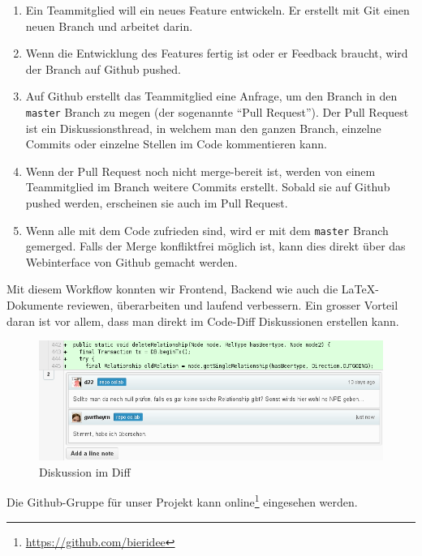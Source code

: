 \documentclass[10pt,a4paper]{scrartcl}
\begin{document}
\begin{enumerate}
	\item Ein Teammitglied will ein neues Feature entwickeln. Er erstellt mit Git einen neuen Branch
		und arbeitet darin.
	\item Wenn die Entwicklung des Features fertig ist oder er Feedback braucht, wird der Branch auf
		Github pushed.
	\item Auf Github erstellt das Teammitglied eine Anfrage, um den Branch in den \texttt{master}
		Branch zu megen (der sogenannte "`Pull Request"'). Der Pull Request ist ein Diskussionsthread,
		in welchem man den ganzen Branch, einzelne Commits oder einzelne Stellen im Code kommentieren
		kann.
	\item Wenn der Pull Request noch nicht merge-bereit ist, werden von einem Teammitglied im Branch
		weitere Commits erstellt. Sobald sie auf Github pushed werden, erscheinen sie auch im Pull
		Request.
	\item Wenn alle mit dem Code zufrieden sind, wird er mit dem \texttt{master} Branch gemerged.
		Falls der Merge konfliktfrei möglich ist, kann dies direkt über das Webinterface von Github
		gemacht werden.
\end{enumerate}

Mit diesem Workflow konnten wir Frontend, Backend wie auch die LaTeX-Dokumente reviewen,
überarbeiten und laufend verbessern. Ein grosser Vorteil daran ist vor allem, dass man direkt im
Code-Diff Diskussionen erstellen kann.

\begin{figure}[H]
	\begin{center}
		\includegraphics[width=\textwidth]{img/github2.png}
	\end{center}
	\caption{Diskussion im Diff}
\end{figure}

Die Github-Gruppe für unser Projekt kann online\footnote{\url{https://github.com/bieridee}}
eingesehen werden.
\end{document}
